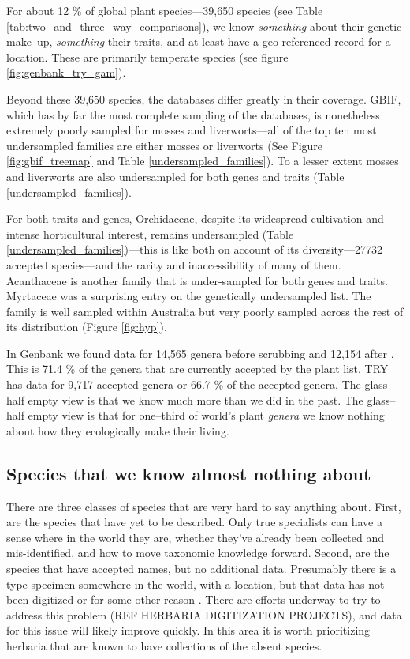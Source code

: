\documentclass[a4paper,11pt]{article}
\begin{document}
For about 12 \% of global plant species---39,650 species (see Table \ref{tab:two_and_three_way_comparisons}), we know \emph{something} about their genetic make--up, \emph{something} their traits, and at least have a geo-referenced record for a location.  These are primarily temperate species (see figure \ref{fig:genbank_try_gam}).

Beyond these 39,650 species, the databases differ greatly in their coverage.  GBIF, which has by far the most complete sampling of the databases, is nonetheless extremely poorly sampled for mosses and liverworts---all of the top ten most undersampled families are either mosses or liverworts (See Figure \ref{fig:gbif_treemap} and Table \ref{undersampled_families}).  To a lesser extent mosses and liverworts are also undersampled for both genes and traits (Table \ref{undersampled_families}).  

For both traits and genes, Orchidaceae, despite its widespread cultivation and intense horticultural interest, remains undersampled (Table \ref{undersampled_families})---this is like both on account of its diversity---27732 accepted species---and the rarity and inaccessibility of many of them.  Acanthaceae is another family that is under-sampled for both genes and traits.  Myrtaceae was a surprising entry on the genetically undersampled list.  The family is well sampled within Australia but very poorly sampled across the rest of its distribution (Figure \ref{fig:hyp}).  

In Genbank we found data for 14,565 genera before scrubbing and 12,154 after \citep[see][for a detailed analysis of number of genes and phylogenetic distribution of the data]{hinchliff2014some}.  This is 71.4 \% of the genera that are currently accepted by the plant list.  TRY has data for 9,717 accepted genera or 66.7 \% of the accepted genera.  The glass--half empty view is that we know much more than we did in the past.  The glass--half empty view is that for one--third of world's plant \emph{genera} we know nothing about how they ecologically make their living.  

\subsection{Species that we know almost nothing about}

There are three classes of species that are very hard to say anything about.  First, are the species that have yet to be described.  Only true specialists can have a sense where in the world they are, whether they've already been collected and mis-identified, and how to move taxonomic knowledge forward.  Second, are the species that have accepted names, but no additional data.  Presumably there is a type specimen somewhere in the world, with a location, but that data has not been digitized or for some other reason .  There are efforts underway to try to address this problem (REF HERBARIA DIGITIZATION PROJECTS), and data for this issue will likely improve quickly.  In this area it is worth prioritizing herbaria that are known to have collections of the absent species.  
\end{document}
